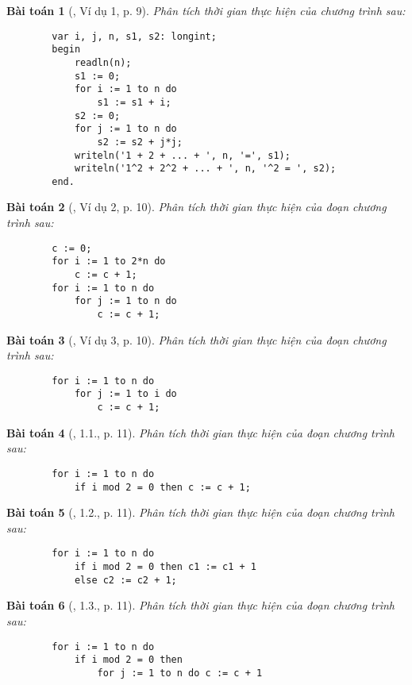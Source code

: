 \documentclass{article}
\newtheorem{baitoan}{Bài toán}
\begin{document}
\begin{baitoan}[\cite{TLGK_chuyen_Tin_quyen_1}, Ví dụ 1, p. 9]
	Phân tích thời gian thực hiện của chương trình sau:
	\begin{verbatim}
		var i, j, n, s1, s2: longint;
		begin
		    readln(n);
		    s1 := 0;
		    for i := 1 to n do
		        s1 := s1 + i;
		    s2 := 0;
		    for j := 1 to n do
		        s2 := s2 + j*j;
		    writeln('1 + 2 + ... + ', n, '=', s1);
		    writeln('1^2 + 2^2 + ... + ', n, '^2 = ', s2);
		end.
	\end{verbatim}
\end{baitoan}

\begin{baitoan}[\cite{TLGK_chuyen_Tin_quyen_1}, Ví dụ 2, p. 10]
	Phân tích thời gian thực hiện của đoạn chương trình sau:
	\begin{verbatim}
		c := 0;
		for i := 1 to 2*n do
		    c := c + 1;
		for i := 1 to n do
		    for j := 1 to n do
		        c := c + 1;
	\end{verbatim}
\end{baitoan}

\begin{baitoan}[\cite{TLGK_chuyen_Tin_quyen_1}, Ví dụ 3, p. 10]
	Phân tích thời gian thực hiện của đoạn chương trình sau:
	\begin{verbatim}
		for i := 1 to n do
		    for j := 1 to i do
		        c := c + 1;
	\end{verbatim}
\end{baitoan}

\begin{baitoan}[\cite{TLGK_chuyen_Tin_quyen_1}, 1.1., p. 11]
	Phân tích thời gian thực hiện của đoạn chương trình sau:
	\begin{verbatim}
		for i := 1 to n do
		    if i mod 2 = 0 then c := c + 1;
	\end{verbatim}
\end{baitoan}

\begin{baitoan}[\cite{TLGK_chuyen_Tin_quyen_1}, 1.2., p. 11]
	Phân tích thời gian thực hiện của đoạn chương trình sau:
	\begin{verbatim}
		for i := 1 to n do
		    if i mod 2 = 0 then c1 := c1 + 1
		    else c2 := c2 + 1;
	\end{verbatim}
\end{baitoan}

\begin{baitoan}[\cite{TLGK_chuyen_Tin_quyen_1}, 1.3., p. 11]
	Phân tích thời gian thực hiện của đoạn chương trình sau:
	\begin{verbatim}
		for i := 1 to n do
		    if i mod 2 = 0 then
		        for j := 1 to n do c := c + 1
	\end{verbatim}
\end{baitoan}
\end{document}
